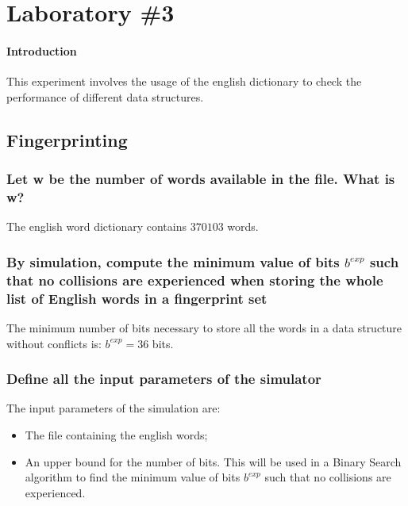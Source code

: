 \documentclass{report}
\begin{document}
			
			
			
			
\chapter{Laboratory \#3}
	 \subsubsection{Introduction}
				This experiment involves the usage of the english dictionary to check the performance of different data structures. 
	 
	 \section{Fingerprinting}	 
	 
			 	\subsection{Let w be the number of words available in the file. What is w?}
								The english word dictionary contains $370103$ words.
								
			 	\subsection{By simulation, compute the minimum value of bits $b^{exp}$ such that no collisions are experienced when storing the whole list of English words in a fingerprint set}
						The minimum number of bits necessary to store all the words in a data structure without conflicts is: $b^{exp} = 36$ bits.
						
				\subsection{Define all the input parameters of the simulator}
					The input parameters of the simulation are:
					\begin{itemize}
						\item The file containing the english words;
						\item An upper bound for the number of bits. This will be used in a Binary Search algorithm to find the minimum value of bits $b^{exp}$ such that no collisions are experienced.
					\end{itemize}
					 
\end{document}
